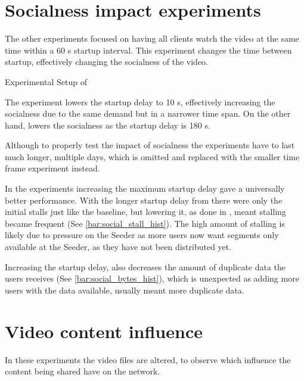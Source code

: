 \if{}

\fi

\FloatBarrier \section{Socialness impact experiments}
\label{sec:eval_socialness}
The other experiments focused on having all clients watch the video at the same time within a 60 \ac{s} startup interval. This experiment changes the time between startup, effectively changing the socialness of the video.

\begin{table}[!htbp]
    \myfloatalign
    \caption[Experimental Setup of Socialness]{Experimental Setup of }
    \label{tab:exp_overview_socialness}
    
\end{table}

The experiment  lowers the startup delay to 10 \ac{s}, effectively increasing the socialness due to the same demand but in a narrower time span. On the other hand,  lowers the socialness as the startup delay is 180 \ac{s}.

Although to properly test the impact of socialness the experiments have to last much longer, multiple days, which is omitted and replaced with the smaller time frame experiment instead.

In the experiments increasing the maximum startup delay gave a universally better performance. With the longer startup delay from  there were only the initial stalls just like the baseline, but lowering it, as done in , meant stalling became frequent (See \autoref{bar:social_stall_hist}). The high amount of stalling is likely due to pressure on the Seeder as more users now want segments only available at the Seeder, as they have not been distributed yet.

Increasing the startup delay, also decreases the amount of duplicate data the users receives (See \autoref{bar:social_bytes_hist}), which is unexpected as adding more users with the data available, usually meant more duplicate data.

\if{}


\fi

\FloatBarrier 
\section{Video content influence}
\label{sec:eval_video}
In these experiments the video files are altered, to observe which influence the content being shared have on the network.

